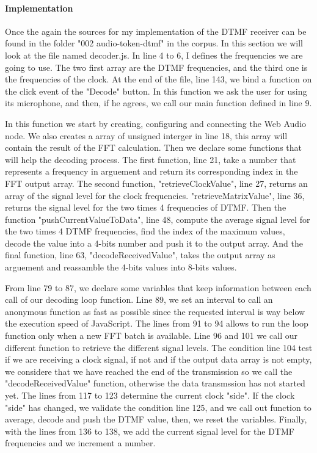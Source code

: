 \documentclass[twocolumn,14pt]{extarticle}
\begin{document}
\paragraph{Implementation}
Once the again the sources for my implementation of the DTMF receiver can be found in the folder "002 audio-token-dtmf" in the corpus. In this section we will look at the file named decoder.js. In line 4 to 6, I defines the frequencies we are going to use. The two first array are the DTMF frequencies, and the third one is the frequencies of the clock. At the end of the file, line 143, we bind a function on the click event of the "Decode" button. In this function we ask the user for using its microphone, and then, if he agrees, we call our main function defined in line 9.

In this function we start by creating, configuring and connecting the Web Audio node. We also creates a array of unsigned interger in line 18, this array will contain the result of the FFT calculation. Then we declare some functions that will help the decoding process. The first function, line 21, take a number that represents a frequency in arguement and return its corresponding index in the FFT output array. The second function, "retrieveClockValue", line 27, returns an array of the signal level for the clock frequencies. "retrieveMatrixValue", line 36, returns the signal level for the two times 4 frequencies of DTMF. Then the function "pushCurrentValueToData", line 48, compute the average signal level for the two times 4 DTMF frequencies, find the index of the maximum values, decode the value into a 4-bits number and push it to the output array. And the final function, line 63, "decodeReceivedValue", takes the output array as arguement and reassamble the 4-bits values into 8-bits values.

From line 79 to 87, we declare some variables that keep information between each call of our decoding loop function. Line 89, we set an interval to call an anonymous function as fast as possible since the requested interval is way below the execution speed of JavaScript. The lines from 91 to 94 allows to run the loop function only when a new FFT batch is available. Line 96 and 101 we call our different function to retrieve the different signal levels. The condition line 104 test if we are receiving a clock signal, if not and if the output data array is not empty, we considere that we have reached the end of the transmission so we call the "decodeReceivedValue" function, otherwise the data transmssion has not started yet. The lines from 117 to 123 determine the current clock "side". If the clock "side" has changed, we validate the condition line 125, and we call out function to average, decode and push the DTMF value, then, we reset the variables. Finally, with the lines from 136 to 138, we add the current signal level for the DTMF frequencies and we increment a number.
\end{document}
